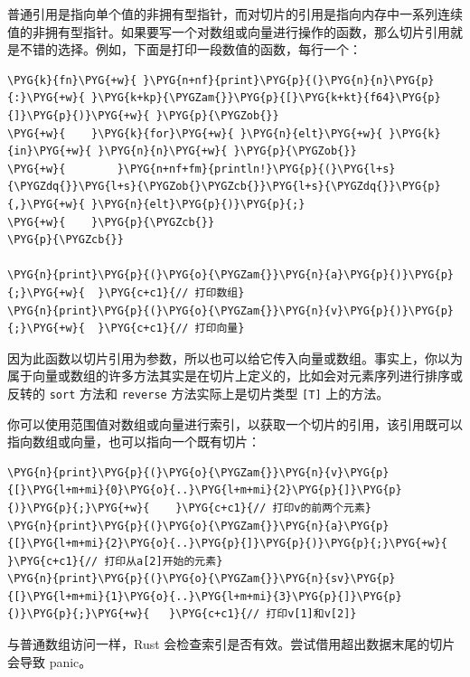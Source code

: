 普通引用是指向单个值的非拥有型指针，而对切片的引用是指向内存中一系列连续值的非拥有型指针。如果要写一个对数组或向量进行操作的函数，那么切片引用就是不错的选择。例如，下面是打印一段数值的函数，每行一个：

\begin{Verbatim}[commandchars=\\\{\},breaklines=true,breakanywhere=true,fontsize=\codefont,xleftmargin=17bp]
\PYG{k}{fn}\PYG{+w}{ }\PYG{n+nf}{print}\PYG{p}{(}\PYG{n}{n}\PYG{p}{:}\PYG{+w}{ }\PYG{k+kp}{\PYGZam{}}\PYG{p}{[}\PYG{k+kt}{f64}\PYG{p}{]}\PYG{p}{)}\PYG{+w}{ }\PYG{p}{\PYGZob{}}
\PYG{+w}{    }\PYG{k}{for}\PYG{+w}{ }\PYG{n}{elt}\PYG{+w}{ }\PYG{k}{in}\PYG{+w}{ }\PYG{n}{n}\PYG{+w}{ }\PYG{p}{\PYGZob{}}
\PYG{+w}{        }\PYG{n+nf+fm}{println!}\PYG{p}{(}\PYG{l+s}{\PYGZdq{}}\PYG{l+s}{\PYGZob{}\PYGZcb{}}\PYG{l+s}{\PYGZdq{}}\PYG{p}{,}\PYG{+w}{ }\PYG{n}{elt}\PYG{p}{)}\PYG{p}{;}
\PYG{+w}{    }\PYG{p}{\PYGZcb{}}
\PYG{p}{\PYGZcb{}}

\PYG{n}{print}\PYG{p}{(}\PYG{o}{\PYGZam{}}\PYG{n}{a}\PYG{p}{)}\PYG{p}{;}\PYG{+w}{  }\PYG{c+c1}{// 打印数组}
\PYG{n}{print}\PYG{p}{(}\PYG{o}{\PYGZam{}}\PYG{n}{v}\PYG{p}{)}\PYG{p}{;}\PYG{+w}{  }\PYG{c+c1}{// 打印向量}
\end{Verbatim}

因为此函数以切片引用为参数，所以也可以给它传入向量或数组。事实上，你以为属于向量或数组的许多方法其实是在切片上定义的，比如会对元素序列进行排序或反转的 \texttt{sort} 方法和 \texttt{reverse} 方法实际上是切片类型 \texttt{[T]} 上的方法。

你可以使用范围值对数组或向量进行索引，以获取一个切片的引用，该引用既可以指向数组或向量，也可以指向一个既有切片：

\begin{Verbatim}[commandchars=\\\{\},breaklines=true,breakanywhere=true,fontsize=\codefont,xleftmargin=17bp]
\PYG{n}{print}\PYG{p}{(}\PYG{o}{\PYGZam{}}\PYG{n}{v}\PYG{p}{[}\PYG{l+m+mi}{0}\PYG{o}{..}\PYG{l+m+mi}{2}\PYG{p}{]}\PYG{p}{)}\PYG{p}{;}\PYG{+w}{    }\PYG{c+c1}{// 打印v的前两个元素}
\PYG{n}{print}\PYG{p}{(}\PYG{o}{\PYGZam{}}\PYG{n}{a}\PYG{p}{[}\PYG{l+m+mi}{2}\PYG{o}{..}\PYG{p}{]}\PYG{p}{)}\PYG{p}{;}\PYG{+w}{     }\PYG{c+c1}{// 打印从a[2]开始的元素}
\PYG{n}{print}\PYG{p}{(}\PYG{o}{\PYGZam{}}\PYG{n}{sv}\PYG{p}{[}\PYG{l+m+mi}{1}\PYG{o}{..}\PYG{l+m+mi}{3}\PYG{p}{]}\PYG{p}{)}\PYG{p}{;}\PYG{+w}{   }\PYG{c+c1}{// 打印v[1]和v[2]}
\end{Verbatim}

与普通数组访问一样，Rust 会检查索引是否有效。尝试借用超出数据末尾的切片会导致 panic。

